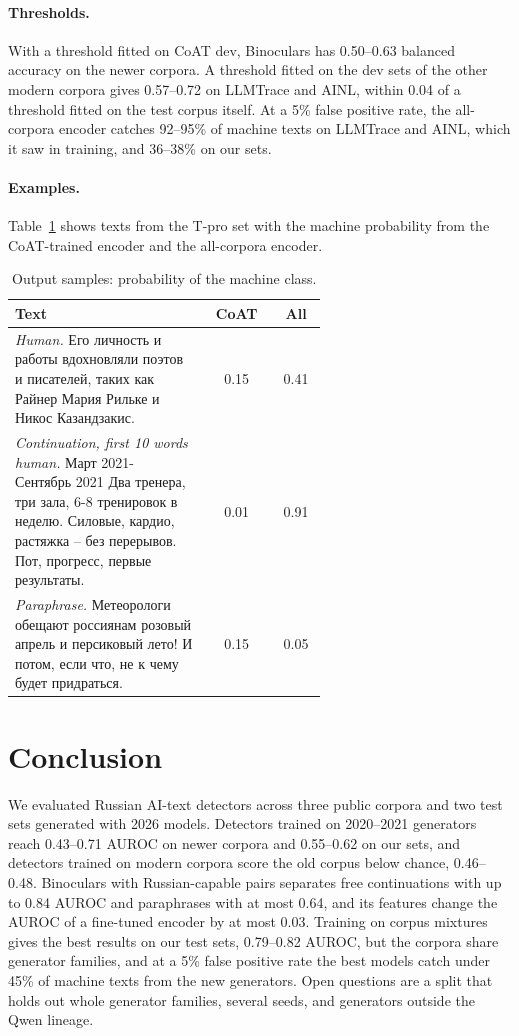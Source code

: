 \documentclass{article}
\begin{document}
\paragraph{Thresholds.} With a threshold fitted on CoAT dev, Binoculars has 0.50--0.63 balanced accuracy on the
newer corpora. A threshold fitted on the dev sets of the other modern corpora gives 0.57--0.72 on LLMTrace and
AINL, within 0.04 of a threshold fitted on the test corpus itself. At a 5\% false positive rate, the all-corpora
encoder catches 92--95\% of machine texts on LLMTrace and AINL, which it saw in training, and 36--38\% on our
sets.

\paragraph{Examples.} Table~\ref{tab:output} shows texts from the T-pro set with the machine probability from the
CoAT-trained encoder and the all-corpora encoder.

\begin{table}[!tbh]
\centering
\small
\begin{tabular}{|p{0.62\linewidth}|c|c|}
\hline
Text & CoAT & All \\
\hline
\emph{Human.} Его личность и работы вдохновляли поэтов и писателей, таких как Райнер Мария Рильке и Никос
Казандзакис. & 0.15 & 0.41 \\
\hline
\emph{Continuation, first 10 words human.} Март 2021- Сентябрь 2021 Два тренера, три зала, 6-8 тренировок в
неделю. Силовые, кардио, растяжка -- без перерывов. Пот, прогресс, первые результаты. & 0.01 & 0.91 \\
\hline
\emph{Paraphrase.} Метеорологи обещают россиянам розовый апрель и персиковый лето! И потом, если что, не к чему
будет придраться. & 0.15 & 0.05 \\
\hline
\end{tabular}
\caption{Output samples: probability of the machine class.}
\label{tab:output}
\end{table}


\section{Conclusion}
We evaluated Russian AI-text detectors across three public corpora and two test sets generated with 2026 models.
Detectors trained on 2020--2021 generators reach 0.43--0.71 AUROC on newer corpora and 0.55--0.62 on our sets,
and detectors trained on modern corpora score the old corpus below chance, 0.46--0.48. Binoculars with
Russian-capable pairs separates free continuations with up to 0.84 AUROC and paraphrases with at most 0.64, and
its features change the AUROC of a fine-tuned encoder by at most 0.03. Training on corpus
mixtures gives the best results on our test sets, 0.79--0.82 AUROC, but the corpora share generator families, and
at a 5\% false positive rate the best models catch under 45\% of machine texts from the new generators. Open
questions are a split that holds out whole generator families, several seeds, and generators outside the Qwen
lineage.




\end{document}
